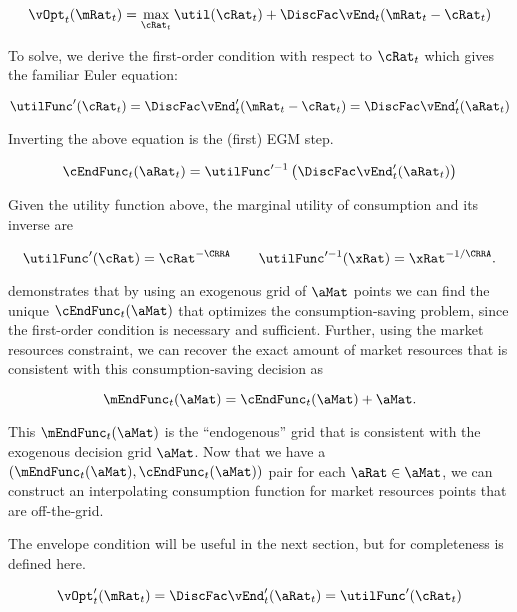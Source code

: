 \documentclass[\econtexRoot/SequentialEGM]{subfiles}
\begin{document}
\begin{equation}
  \vOpt_{t}(\mRat_{t}) = \max_{\cRat_{t}} \util(\cRat_{t}) +
  \DiscFac \vEnd_{t}(\mRat_{t}-\cRat_{t})
\end{equation}

To solve, we derive the first-order condition with respect to $\cRat_{t}$ which gives the familiar Euler equation:

\begin{equation}
  \utilFunc'(\cRat_t) = \DiscFac \vEnd_{t}'(\mRat_{t} - \cRat_{t}) = \DiscFac
  \vEnd_{t}'(\aRat_{t})
\end{equation}

Inverting the above equation is the (first) EGM step.

\begin{equation}
  \cEndFunc_{t}(\aRat_{t}) = \utilFunc'^{-1}\left( \DiscFac \vEnd_{t}'(\aRat_{t})
  \right)
\end{equation}

Given the utility function above, the marginal utility of consumption and its inverse are

\begin{equation}
  \utilFunc'(\cRat) = \cRat^{-\CRRA} \qquad \utilFunc'^{-1}(\xRat) =
  \xRat^{-1/\CRRA}.
\end{equation}

\cite{Carroll2006} demonstrates that by using an exogenous grid of $\aMat$ points we can find the unique
$\cEndFunc_{t}(\aMat)$ that optimizes the consumption-saving problem, since the first-order condition is necessary and sufficient.
Further, using the market resources constraint, we can recover the exact amount
of market resources that is consistent with this consumption-saving decision as

\begin{equation}
  \mEndFunc_{t}(\aMat) = \cEndFunc_{t}(\aMat) + \aMat.
\end{equation}

This $\mEndFunc_{t}(\aMat)$ is the ``endogenous'' grid that is consistent
with the exogenous decision grid $\aMat$. Now that we have a
$(\mEndFunc_{t}(\aMat), \cEndFunc_{t}(\aMat))$ pair for each
$\aRat \in \aMat$, we can construct an interpolating consumption function for
market resources points that are off-the-grid.

The envelope condition will be useful in the next section, but for completeness
is defined here.

\begin{equation}
  \vOpt_{t}'(\mRat_{t}) = \DiscFac \vEnd_{t}'(\aRat_{t}) = \utilFunc'(\cRat_{t})
\end{equation}
\end{document}
